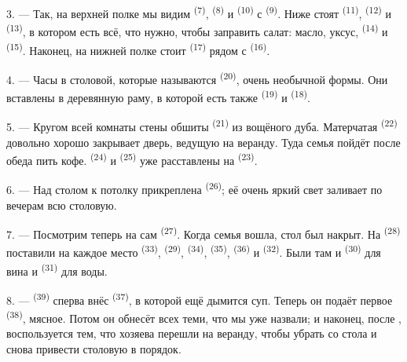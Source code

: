 3. --- Так, на верхней полке мы видим 
\textsuperscript{(7)},  \textsuperscript{(8)} и 
\textsuperscript{(10)} с  \textsuperscript{(9)}. Ниже стоят
 \textsuperscript{(11)},  \textsuperscript{(12)} и
 \textsuperscript{(13)}, в котором есть всё, что нужно, чтобы
заправить салат: масло, уксус,  \textsuperscript{(14)} и
 \textsuperscript{(15)}. Наконец, на нижней полке стоит
 \textsuperscript{(17)} рядом с 
\textsuperscript{(16)}.

4. --- Часы в столовой, которые называются 
\textsuperscript{(20)}, очень необычной формы. Они вставлены в деревянную раму,
в которой есть также  \textsuperscript{(19)} и
 \textsuperscript{(18)}.

\VUsaut{4.6mm}
\VUsaut{3.0mm}

5. --- Кругом всей комнаты стены обшиты 
\textsuperscript{(21)} из вощёного дуба. Матерчатая 
\textsuperscript{(22)} довольно хорошо закрывает дверь, ведущую на веранду.
Туда семья пойдёт после обеда пить кофе.  \textsuperscript{(24)}
и  \textsuperscript{(25)} уже расставлены на 
\textsuperscript{(23)}.

6. --- Над столом к потолку прикреплена 
\textsuperscript{(26)}; её очень яркий свет заливает по вечерам всю столовую.

7. --- Посмотрим теперь на сам  \textsuperscript{(27)}.
Когда семья вошла, стол был накрыт. На  \textsuperscript{(28)}
поставили на каждое место  \textsuperscript{(33)},
 \textsuperscript{(29)},  \textsuperscript{(34)},
 \textsuperscript{(35)},  \textsuperscript{(36)} и
 \textsuperscript{(32)}. Были там и 
\textsuperscript{(30)} для вина и  \textsuperscript{(31)} для воды.

8. ---  \textsuperscript{(39)} сперва внёс 
\textsuperscript{(37)}, в которой ещё дымится суп. Теперь он подаёт первое
 \textsuperscript{(38)}, мясное. Потом он обнесёт всех теми, что мы
уже назвали; и наконец, после , воспользуется тем, что
хозяева перешли на веранду, чтобы убрать со стола и снова привести
столовую в порядок.

